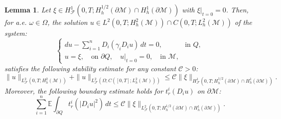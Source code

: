 \documentclass[10pt,a4paper]{amsart}
\newtheorem{lemma}{Lemma}
\begin{document}
\begin{lemma}\label{lemmaoftheu}
Let $\xi \in H_{\mathcal{F}}^1(0,T; H_h^{1/2}(\partial \mathcal{M}) \cap H_h^1(\partial \mathcal{M}))$ with $\left.\xi\right|_{t=0} = 0$. Then, for a.e. $\omega \in \Omega$, the solution $u \in L^2(0,T; H_h^2(\mathcal{M})) \cap C(0,T; L_h^2(\mathcal{M}))$ of the system:
\begin{equation}\label{sys:homogeneuous}
    \begin{cases}
    du - \sum_{i=1}^{n} D_i(\gamma_i D_i u) \, dt = 0, & \text{in } Q, \\
    u = \xi,\quad\text{on } \partial Q,\quad \left.u\right|_{t=0} = 0,\quad  \text{in } \mathcal{M},
    \end{cases}
\end{equation}
satisfies the following stability estimate for any constant $\mathcal{C} > 0$:
\begin{equation}\label{ine:stability:H2}
    \|u\|_{L^2_{\mathcal{F}}(0,T; H_h^2(\mathcal{M}))} + \|u\|_{L^2_{\mathcal{F}}(\Omega; C([0,T]; L_h^2(\mathcal{M})))} \leq \mathcal{C} \|\xi\|_{H^1_{\mathcal{F}}(0,T; H_h^{1/2}(\partial \mathcal{M}) \cap H_h^1(\partial \mathcal{M}))}.
\end{equation}
Moreover, the following boundary estimate holds for $t_r^i(D_i u)$ on $\partial\mathcal{M}$:
\begin{equation}\label{ine:stability:boundary}
    \sum_{i=1}^{n} \mathbb{E} \int_{\partial Q} t_r^i(|D_i u|^2) \, dt \leq \mathcal{C} \|\xi\|_{L^2_{\mathcal{F}}(0,T; H_h^{1/2}(\partial \mathcal{M}) \cap H_h^1(\partial \mathcal{M}))}.
\end{equation}
\end{lemma}
\end{document}
